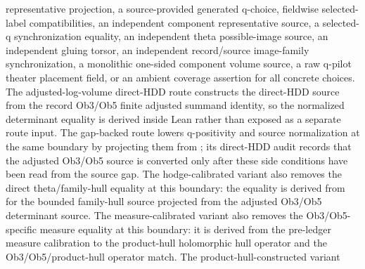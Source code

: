 \begin{proposition}
  representative projection, a source-provided generated q-choice, fieldwise
  selected-label compatibilities, an independent component representative
  source, a selected-q synchronization equality, an independent theta
  possible-image source, an independent gluing torsor, an independent
  record/source image-family synchronization, a monolithic one-sided component
  volume source, a raw q-pilot theater placement field, or an ambient coverage
  assertion for all concrete choices.
  The adjusted-log-volume direct-HDD route
  constructs the direct-HDD source from the record Ob3/Ob5 finite adjusted
  summand identity, so the normalized determinant equality is derived inside
  Lean rather than exposed as a separate route input.  The gap-backed route
  lowers q-positivity and source normalization at the same boundary by
  projecting them from
  ; its direct-HDD audit records
  that the adjusted Ob3/Ob5 source is converted only after these side
  conditions have been read from the source gap.  The hodge-calibrated variant
  also removes the direct theta/family-hull equality at this boundary: the
  equality is derived from
   for the
  bounded family-hull source projected from the adjusted Ob3/Ob5 determinant
  source.  The measure-calibrated variant
  also removes the Ob3/Ob5-specific measure equality at this boundary: it is
  derived from the pre-ledger measure calibration to the product-hull
  holomorphic hull operator and the Ob3/Ob5/product-hull operator match.  The
  product-hull-constructed variant

\end{proposition}

